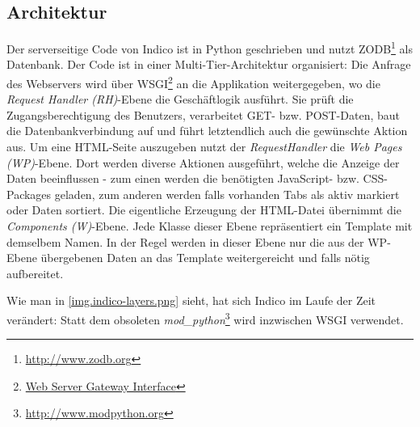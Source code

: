 \subsection{Architektur}
Der serverseitige Code von Indico ist in Python geschrieben und nutzt
ZODB\footnote{\href{http://www.zodb.org}{http://www.zodb.org}} als Datenbank. Der Code ist in einer
Multi-Tier-Architektur organisiert: Die Anfrage des Webservers wird über
WSGI\footnote{\href{http://www.python.org/dev/peps/pep-0333/}{Web Server Gateway Interface}} an die
Applikation weitergegeben, wo die \emph{Request Handler (RH)}-Ebene die Geschäftlogik ausführt. Sie
prüft die Zugangsberechtigung des Benutzers, verarbeitet GET- bzw. POST-Daten, baut die
Datenbankverbindung auf und führt letztendlich auch die gewünschte Aktion aus. Um eine HTML-Seite
auszugeben nutzt der \emph{RequestHandler} die \emph{Web Pages (WP)}-Ebene. Dort werden diverse
Aktionen ausgeführt, welche die Anzeige der Daten beeinflussen - zum einen werden die benötigten
JavaScript- bzw. CSS-Packages geladen, zum anderen werden falls vorhanden Tabs als aktiv markiert
oder Daten sortiert. Die eigentliche Erzeugung der HTML-Datei übernimmt die \emph{Components
(W)}-Ebene. Jede Klasse dieser Ebene repräsentiert ein Template mit demselbem Namen. In der Regel
werden in dieser Ebene nur die aus der WP-Ebene übergebenen Daten an das Template weitergereicht und
falls nötig aufbereitet.


Wie man in \autoref{img.indico-layers.png} sieht, hat sich Indico im Laufe der Zeit verändert: Statt
dem obsoleten \emph{mod\_python}\footnote{\href{http://www.modpython.org}{http://www.modpython.org}}
wird inzwischen WSGI verwendet.
